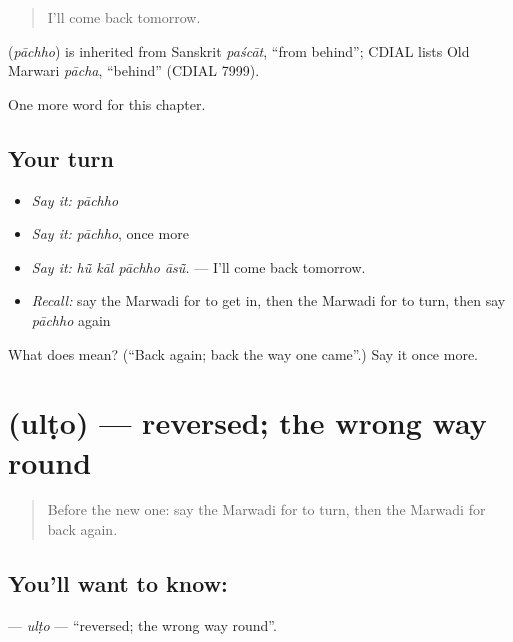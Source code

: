 \begin{quote}
I'll come back tomorrow.
\end{quote}

\begin{cousinweb}
\textbf{} (\emph{pāchho}) is inherited from Sanskrit \emph{paścāt}, \textquotedblleft{}from behind\textquotedblright{}; CDIAL lists Old Marwari \emph{pācha}, \textquotedblleft{}behind\textquotedblright{} (CDIAL 7999).
\end{cousinweb}

\begin{grammarlens}[title={What you've built}]
One more word for this chapter.
\end{grammarlens}

\subsection*{Your turn}
\begin{itemize}
\raggedright
  \item \emph{Say it:} \emph{pāchho}
  \item \emph{Say it:} \emph{pāchho}, once more
  \item \emph{Say it:} \emph{hū̃ kāl pāchho āsū̃.} — I'll come back tomorrow.
  \item \emph{Recall:} say the Marwadi for to get in, then the Marwadi for to turn, then say \emph{pāchho} again
\end{itemize}

\begin{tcolorbox}[breakable,colback=teal!4,colframe=teal!35!black,title={Before you move on}]
What does  mean? (\textquotedblleft{}Back again; back the way one came\textquotedblright{}.) Say it once more.
\end{tcolorbox}
\section[\texorpdfstring{\mw{उलटो} (ulṭo)}{उलटो (ulṭo)}]{ (ulṭo) — reversed; the wrong way round}

\label{lesson:MW-C202-ulto}



\begin{quote}
Before the new one: say the Marwadi for to turn, then the Marwadi for back again.
\end{quote}

\subsection*{You'll want to know: }
\textbf{} — \emph{ulṭo} — \textquotedblleft{}reversed; the wrong way round\textquotedblright{}.

